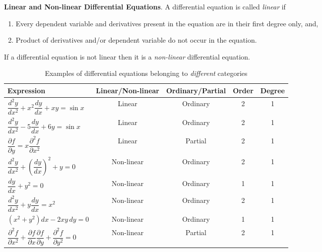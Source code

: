 \documentclass{book}
\theoremstyle{definition}
\begin{document}
\textbf{Linear and Non-linear Differential Equations}. A differential equation is called \textit{linear} if 
\begin{enumerate}[label=(\alph*)]
    \item Every dependent variable and derivatives present in the equation are in their first degree only, and,
    \item Product of derivatives and/or dependent variable do not occur in the equation.
\end{enumerate}
If a differential equation is not linear then it is a \textit{non-linear} differential equation.

\begin{table}[h]
    \centering
    \begin{tabular}{lcccc}
        \toprule[1.2pt]
        Expression & Linear/Non-linear & Ordinary/Partial & Order & Degree \\
        \midrule
        $\dfrac{d^2y}{dx^2}+x^2\dfrac{dy}{dx}+xy=\sin x$ & Linear & Ordinary & 2 & 1 \\
        $\dfrac{d^2y}{dx^2}-5\dfrac{dy}{dx}+6y=\sin x$ & Linear & Ordinary & 2 & 1 \\
        $\dfrac{\partial f}{\partial y}=x\dfrac{\partial^2f}{\partial x^2}$ & Linear & Partial & 2 & 1 \\
        $\dfrac{d^2y}{dx^2}+(\dfrac{dy}{dx})^2+y=0$ & Non-linear & Ordinary & 2 & 1 \\ 
        $\dfrac{dy}{dx}+y^2=0$ & Non-linear & Ordinary & 1 & 1 \\ 
        $\dfrac{d^2y}{dx^2}+y\dfrac{dy}{dx}=x^2$ & Non-linear & Ordinary & 2 & 1 \\
        $(x^2+y^2)dx-2xy\,dy=0$ & Non-linear & Ordinary & 1 & 1 \\
        $\dfrac{\partial^2f}{\partial x^2}+\dfrac{\partial f}{\partial x}\dfrac{\partial f}{\partial y}+\dfrac{\partial^2f}{\partial y^2}=0$ & Non-linear & Partial & 2 & 1 \\
        \bottomrule[1.2pt]
    \end{tabular}
    \caption{Examples of differential equations belonging to \emph{different} categories}
    \label{tab:examples}
\end{table}
\newpage
\end{document}

